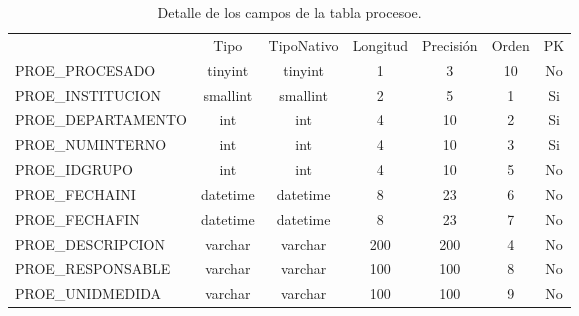 				\begin{table}[H]
					\centering
					\caption{Detalle de los campos de la tabla procesoe.}
					\label{tab_procesoe}
					\begin{tabular}{|l|c|c|c|c|c|c|}
						\hline
						\rowcolor[HTML]{329A9D} 
						\multicolumn{7}{|c|}{\cellcolor[HTML]{329A9D}PROCESOE}                                                           \\ \hline
						\rowcolor[HTML]{00D2CB} 
						\multicolumn{1}{|c|}{\cellcolor[HTML]{00D2CB}Nombre} & Tipo     & TipoNativo & Longitud & Precisi\'on & Orden & PK \\ \hline
						PROE\_PROCESADO                                      & tinyint  & tinyint    & 1        & 3         & 10    & No \\ \hline
						PROE\_INSTITUCION                                    & smallint & smallint   & 2        & 5         & 1     & Si \\ \hline
						PROE\_DEPARTAMENTO                                   & int      & int        & 4        & 10        & 2     & Si \\ \hline
						PROE\_NUMINTERNO                                     & int      & int        & 4        & 10        & 3     & Si \\ \hline
						PROE\_IDGRUPO                                        & int      & int        & 4        & 10        & 5     & No \\ \hline
						PROE\_FECHAINI                                       & datetime & datetime   & 8        & 23        & 6     & No \\ \hline
						PROE\_FECHAFIN                                       & datetime & datetime   & 8        & 23        & 7     & No \\ \hline
						PROE\_DESCRIPCION                                    & varchar  & varchar    & 200      & 200       & 4     & No \\ \hline
						PROE\_RESPONSABLE                                    & varchar  & varchar    & 100      & 100       & 8     & No \\ \hline
						PROE\_UNIDMEDIDA                                     & varchar  & varchar    & 100      & 100       & 9     & No \\ \hline
					\end{tabular}
				\end{table}

